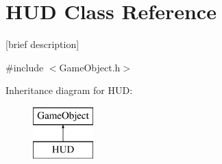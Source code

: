 \hypertarget{class_h_u_d}{\section{H\-U\-D Class Reference}
\label{class_h_u_d}
}


\mbox{[}brief description\mbox{]}  




{\ttfamily \#include $<$Game\-Object.\-h$>$}

Inheritance diagram for H\-U\-D\-:\begin{figure}[H]
\begin{center}
\leavevmode
\includegraphics[height=2.000000cm]{class_h_u_d}
\end{center}
\end{figure}
